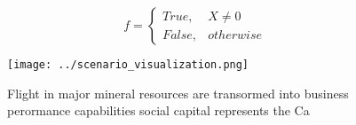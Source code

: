 \documentclass[a4paper]{article}
\begin{document}
\begin{equation}   f =
\begin{cases} True, & X \neq 0\\
False, & otherwise
\end{cases}
\end{equation}

\begin{figure}
\centering
\texttt{[image: ../scenario\_visualization.png]}
\caption{Flight in major mineral resources are transormed into business perormance capabilities social capital represents the Ca
}
\end{figure}
 
\end{document}
